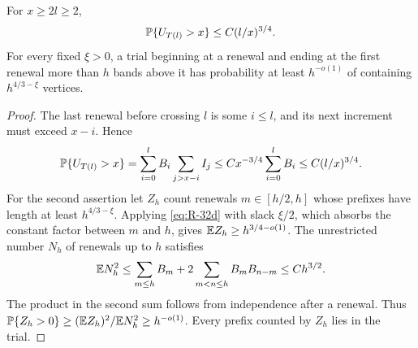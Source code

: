 \begin{lemma}
\label{lem:08-renewal-trial}
For \(x\ge2l\ge2\),
\[
 \mathbb P\{U_{T(l)}>x\}\le C(l/x)^{3/4}.
\]
For every fixed \(\xi>0\), a trial beginning at a renewal and ending at
the first renewal more than \(h\) bands above it has probability at least
\(h^{-o(1)}\) of containing \(h^{4/3-\xi}\) vertices.
\end{lemma}
\begin{proof}
The last renewal before crossing \(l\) is some \(i\le l\), and its next
increment must exceed \(x-i\). Hence
\[
 \mathbb P\{U_{T(l)}>x\}
 =\sum_{i=0}^{l}B_i\sum_{j>x-i}I_j
 \le Cx^{-3/4}\sum_{i=0}^{l}B_i
 \le C(l/x)^{3/4}.
\]
For the second assertion let \(Z_h\) count renewals
\(m\in[h/2,h]\) whose prefixes have length at least
\(h^{4/3-\xi}\). Applying \eqref{eq:R-32d} with slack \(\xi/2\),
which absorbs the constant factor between \(m\) and \(h\), gives
\(\mathbb E Z_h\ge h^{3/4-o(1)}\). The unrestricted number \(N_h\) of
renewals up to \(h\) satisfies
\[
 \mathbb E N_h^2
 \le\sum_{m\le h}B_m+
       2\sum_{m<n\le h}B_mB_{n-m}
 \le Ch^{3/2}.
\]
The product in the second sum follows from independence after a renewal.
Thus \(\mathbb P\{Z_h>0\}\ge(\mathbb E Z_h)^2/\mathbb E N_h^2\ge h^{-o(1)}\).
Every prefix counted by \(Z_h\) lies in the trial.
\end{proof}

